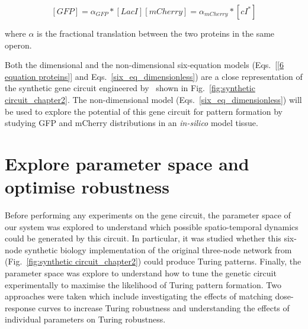 \begin{subequations}
    \begin{equation}
        [GFP] = \alpha_{GFP}*[LacI]
    \end{equation}
    \begin{equation}
        [mCherry] = \alpha_{mCherry}*[cI^*]
    \end{equation}
    \label{linear_fluorescence}
\end{subequations}

where $\alpha$ is the fractional translation between the two proteins in the same operon.


Both the dimensional and the non-dimensional six-equation models
(Eqs.~\ref{[6 equation proteins]} and Eqs.~\ref{six_eq_dimensionless})
are a close representation of the synthetic gene circuit engineered
by~\cite{Tica2020} shown in Fig.~\ref{fig:synthetic circuit_chapter2}.
The non-dimensional model (Eqs.~\ref{six_eq_dimensionless})
will be used to explore the potential of this gene circuit for pattern formation by studying GFP and mCherry distributions in an \textit{in-silico} model tissue.



\section{Explore parameter space and optimise robustness}
Before performing any experiments on the gene circuit,
the parameter space of our system was explored
to understand which possible spatio-temporal dynamics could be generated by this circuit.
In particular, it was studied
whether this six-node synthetic biology implementation of the original three-node network from~\cite{Scholes2019} (Fig.~\ref{fig:synthetic circuit_chapter2}) could produce Turing patterns.
Finally, the parameter space was explore to understand how to tune the genetic circuit experimentally to maximise the likelihood of Turing pattern formation.
Two approaches were taken
which include
investigating the effects of matching dose-response curves to increase Turing robustness
and understanding the effects of individual parameters on Turing robustness.

